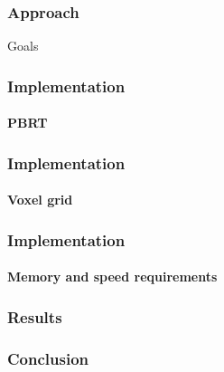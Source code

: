 \documentclass{beamer}
\begin{document}
  
  \begin{frame}
    \frametitle{Approach}
	Goals
  \end{frame}
  
  
  \begin{frame}
    \frametitle{Implementation}
    \framesubtitle{PBRT}
  \end{frame}
  
  \begin{frame}
    \frametitle{Implementation}
    \framesubtitle{Voxel grid}
  \end{frame}
  
  \begin{frame}
    \frametitle{Implementation}
    \framesubtitle{Memory and speed requirements}
  \end{frame}
  
  
  
  
  
  \begin{frame}
    \frametitle{Results}
  \end{frame}
  
  \begin{frame}
    \frametitle{Conclusion}
  \end{frame}
  
\end{document}
